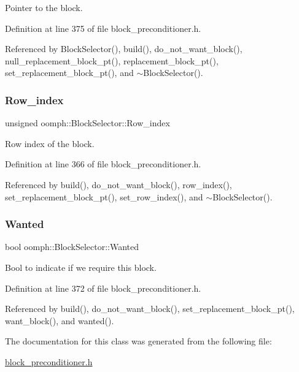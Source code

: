 Pointer to the block. 



Definition at line 375 of file block\+\_\+preconditioner.\+h.



Referenced by Block\+Selector(), build(), do\+\_\+not\+\_\+want\+\_\+block(), null\+\_\+replacement\+\_\+block\+\_\+pt(), replacement\+\_\+block\+\_\+pt(), set\+\_\+replacement\+\_\+block\+\_\+pt(), and $\sim$\+Block\+Selector().

\mbox{\label{classoomph_1_1BlockSelector_ae48060783b1f4744b14a4477190e205e}} 
\subsubsection{\texorpdfstring{Row\+\_\+index}{Row\_index}}
{\footnotesize\ttfamily unsigned oomph\+::\+Block\+Selector\+::\+Row\+\_\+index\hspace{0.3cm}{\ttfamily [private]}}



Row index of the block. 



Definition at line 366 of file block\+\_\+preconditioner.\+h.



Referenced by build(), do\+\_\+not\+\_\+want\+\_\+block(), row\+\_\+index(), set\+\_\+replacement\+\_\+block\+\_\+pt(), set\+\_\+row\+\_\+index(), and $\sim$\+Block\+Selector().

\mbox{\label{classoomph_1_1BlockSelector_ad5b7ec23096f89f3d0cceed70ca07fdb}} 
\subsubsection{\texorpdfstring{Wanted}{Wanted}}
{\footnotesize\ttfamily bool oomph\+::\+Block\+Selector\+::\+Wanted\hspace{0.3cm}{\ttfamily [private]}}



Bool to indicate if we require this block. 



Definition at line 372 of file block\+\_\+preconditioner.\+h.



Referenced by build(), do\+\_\+not\+\_\+want\+\_\+block(), set\+\_\+replacement\+\_\+block\+\_\+pt(), want\+\_\+block(), and wanted().



The documentation for this class was generated from the following file\+:\begin{DoxyCompactItemize}
\item 
\hyperlink{block__preconditioner_8h}{block\+\_\+preconditioner.\+h}\end{DoxyCompactItemize}
